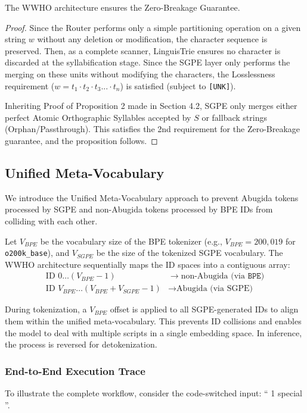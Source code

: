 \begin{proposition}
The WWHO architecture ensures the Zero-Breakage Guarantee.
\end{proposition}

\begin{proof}
Since the Router performs only a simple partitioning operation on a given string $w$ without any deletion or modification, the character sequence is preserved. Then, as a complete scanner, LinguisTrie ensures no character is discarded at the syllabification stage.  Since the SGPE layer only performs the merging on these units without modifying the characters, the Losslessness requirement ($w = t_1\cdot t_2 \cdot t_3 ... \cdot t_n$) is satisfied (subject to \texttt{[UNK]}).

Inheriting Proof of Proposition 2 made in Section 4.2, SGPE only merges either perfect Atomic Orthographic Syllables accepted by $S$ or fallback strings (Orphan/Passthrough). This satisfies the 2nd requirement for the Zero-Breakage guarantee, and the proposition follows.
\end{proof}

\subsection{Unified Meta-Vocabulary}
We introduce the Unified Meta-Vocabulary approach to prevent Abugida tokens processed by SGPE and non-Abugida tokens processed by BPE IDs from colliding with each other.

Let $V_{BPE}$ be the vocabulary size of the BPE tokenizer (e.g., $V_{BPE}=200,019$ for \texttt{o200k\_base}), and $V_{SGPE}$ be the size of the tokenized SGPE vocabulary. The WWHO architecture sequentially maps the ID spaces into a contiguous array:
\begin{align*}
    \text{ID } 0 \dots (V_{BPE}-1) &\longrightarrow \text{non-Abugida (via } \texttt{BPE}) \\
    \text{ID } V_{BPE} \dots (V_{BPE} + V_{SGPE} - 1) &\longrightarrow \text{Abugida (via SGPE)}
\end{align*}

During tokenization, a $V_{BPE}$ offset is applied to all SGPE-generated IDs to align them within the unified meta-vocabulary. This prevents ID collisions and enables the model to deal with multiple scripts in a single embedding space. In inference, the process is reversed for detokenization.

\subsubsection{End-to-End Execution Trace}
To illustrate the complete workflow, consider the code-switched input: `` 1 special ''.

